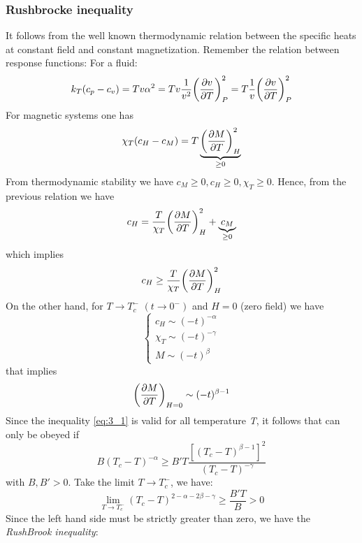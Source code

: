 \documentclass[../main/main.tex]{subfiles}
\begin{document}
\subsubsection{Rushbrocke inequality}
It follows from the well known thermodynamic relation between the specific heats at constant field and constant magnetization.
Remember the relation between response functions:
For a fluid:
\begin{equation*}
   k_T (c_p-c_v)=T v \alpha ^2 = T v \frac{1}{v^2} \qty(\pdv{v}{T} )^2_P = T \frac{1}{v} \qty(\pdv{v}{T} )^2_P
\end{equation*}
For magnetic systems one has
\begin{equation*}
  \chi _T (c_H-c_M) = T \underbrace{ \qty(\pdv{M}{T} )^2_H }_{\geq 0}
\end{equation*}
From thermodynamic stability we have \( c_M \geq 0, c_H \geq 0, \chi _T \geq 0  \).
Hence, from the previous relation we have
\begin{equation*}
   c_H = \frac{T}{\chi _T} \qty(\pdv{M}{T} )^2_H + \underbrace{c_M}_{\ge0}
\end{equation*}
which implies
\begin{equation}
   c_H \ge \frac{T}{\chi _T} \qty(\pdv{M}{T} )^2_H 
   \label{eq:3_1}
\end{equation}
On the other hand, for \( T \rightarrow T_c^- \) \( (t \rightarrow 0^-) \) and \( H=0 \) (zero field) we have
\begin{equation*}
  \begin{cases}
   c_H \sim (-t)^{-\alpha }\\
   \chi _T \sim (-t)^{-\gamma  } \\
    M \sim (-t)^{\beta }
  \end{cases}
\end{equation*}
that implies
\begin{equation*}
 \qty( \pdv{M}{T})_{H=0} \sim (-t)^{\beta -1}    
\end{equation*}
Since the inequality \eqref{eq:3_1} is valid for all temperature \emph{T}, it follows that can only be obeyed if
\begin{equation*}
  B (T_c - T)^{-\alpha } \ge B' T \frac{[(T_c - T)^{\beta -1}]^2}{(T_c-T)^{-\gamma  }}
\end{equation*}
with \( B,B' > 0 \). Take the limit \( T \rightarrow T_c^- \), we have:
\begin{equation*}
  \lim_{T \rightarrow T_c^-} (T_c - T)^{2- \alpha - 2 \beta - \gamma  } \ge \frac{B' T}{B} > 0
\end{equation*}
Since the left hand side must be strictly greater than zero, we have the \textit{RushBrook inequality}:
\end{document}

